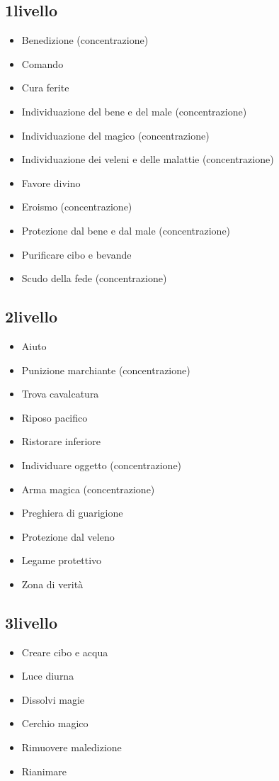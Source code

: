 \documentclass[a4paper,10pt,twoside,twocolumn,openany,bg=full,nodeprecatedcode]{dndbook}
\begin{document}
\subsection{1\degree livello}
\begin{itemize}
  \item Benedizione (concentrazione)
  \item Comando
  \item Cura ferite
  \item Individuazione del bene e del male (concentrazione)
  \item Individuazione del magico (concentrazione)
  \item Individuazione dei veleni e delle malattie (concentrazione)
  \item Favore divino
  \item Eroismo (concentrazione)
  \item Protezione dal bene e dal male (concentrazione)
  \item Purificare cibo e bevande
  \item Scudo della fede (concentrazione)
\end{itemize}

\subsection{2\degree livello}
\begin{itemize}
  \item Aiuto
  \item Punizione marchiante (concentrazione)
  \item Trova cavalcatura
  \item Riposo pacifico
  \item Ristorare inferiore
  \item Individuare oggetto (concentrazione)
  \item Arma magica (concentrazione)
  \item Preghiera di guarigione
  \item Protezione dal veleno
  \item Legame protettivo
  \item Zona di verità
\end{itemize}

\subsection{3\degree livello}
\begin{itemize}
  \item Creare cibo e acqua
  \item Luce diurna
  \item Dissolvi magie
  \item Cerchio magico
  \item Rimuovere maledizione
  \item Rianimare
\end{itemize}
\end{document}
